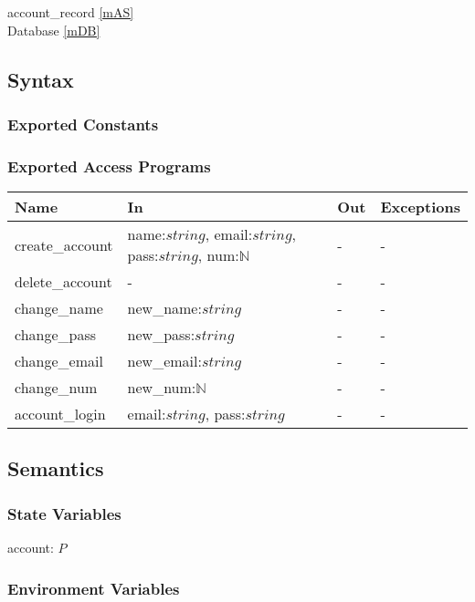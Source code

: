 \documentclass[12pt, titlepage]{article}
\begin{document}
account\_record \ref{mAS} \\
Database \ref{mDB}

\subsection{Syntax}

\subsubsection{Exported Constants}

\subsubsection{Exported Access Programs}

\begin{center}
\begin{tabular}{p{3cm} p{9cm} p{2cm} p{2cm}}
\hline
\textbf{Name} & \textbf{In} & \textbf{Out} & \textbf{Exceptions} \\
\hline
create\_account & name:$string$, email:$string$, pass:$string$, num:$\mathbb{N}$ & - & - \\
delete\_account & - & - & - \\
change\_name & new\_name:$string$ & - & - \\
change\_pass & new\_pass:$string$ & - & - \\
change\_email & new\_email:$string$ & - & - \\
change\_num & new\_num:$\mathbb{N}$ & - & - \\
account\_login & email:$string$, pass:$string$ & - & - \\
\hline
\end{tabular}
\end{center}

\subsection{Semantics}

\subsubsection{State Variables}

account: $P$

\subsubsection{Environment Variables}
\end{document}
